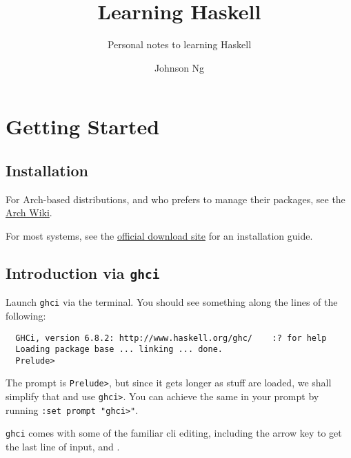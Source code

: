 \documentclass[notoc,notitlepage]{tufte-book}
\title{Learning Haskell}
\author{Johnson Ng}
\subtitle{Personal notes to learning Haskell}
\begin{document}
\hypersetup{pageanchor=false}
\maketitle
\hypersetup{pageanchor=true}
\tableofcontents

\nocite{rwh}
\nocite{lyah}

\chapter{Getting Started}%
\label{chp:getting_started}

\section{Installation}%
\label{sec:installation}

For Arch-based distributions, and who prefers to manage their packages, see the \href{https://wiki.archlinux.org/index.php/Haskell}{Arch Wiki}.

For most systems, see the \href{https://www.haskell.org/platform/}{official download site} for an installation guide.


\section{Introduction via \texttt{ghci}}%
\label{sec:introduction_via_ghci}

Launch \texttt{ghci} via the terminal. You should see something along the lines of the following:

\begin{lstlisting}
  GHCi, version 6.8.2: http://www.haskell.org/ghc/    :? for help
  Loading package base ... linking ... done.
  Prelude>
\end{lstlisting}

The prompt is \texttt{Prelude>}, but since it gets longer as stuff are loaded, we shall simplify that and use \texttt{ghci>}. You can achieve the same in your prompt by running \texttt{:set prompt "ghci>"}.

\texttt{ghci} comes with some of the familiar cli editing, including the  arrow key to get the last line of input, and .
\end{document}
